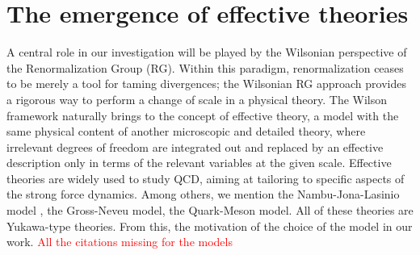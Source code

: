 \section{The emergence of effective theories}
A central role in our investigation will be played by the Wilsonian perspective of the Renormalization Group (RG). Within this paradigm, renormalization ceases to be merely a tool for taming divergences; 
the Wilsonian RG approach provides a rigorous way to perform a change of scale in a physical theory. The Wilson framework naturally brings to the concept of effective theory, a model with the same physical content of another microscopic and detailed theory, where irrelevant degrees of freedom are integrated out and replaced by an effective description only in terms of the relevant variables at the given scale. 
Effective theories are widely used to study QCD, aiming at tailoring to specific aspects of the strong force dynamics. 
Among others, we mention the Nambu-Jona-Lasinio model \cite{Nambu1961DynamicalI, Nambu1961DynamicalII}, the Gross-Neveu model, the Quark-Meson model. All of these theories are Yukawa-type theories. From this, the motivation of the choice of the model in our work. \textcolor{red}{All the citations missing for the models}
